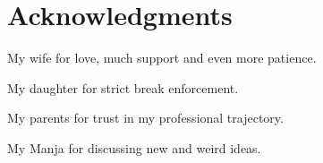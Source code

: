 \section*{Acknowledgments}

My wife for love, much support and even more patience.

My daughter for strict break enforcement.

My parents for trust in my professional trajectory.

My Manja for discussing new and weird ideas.
